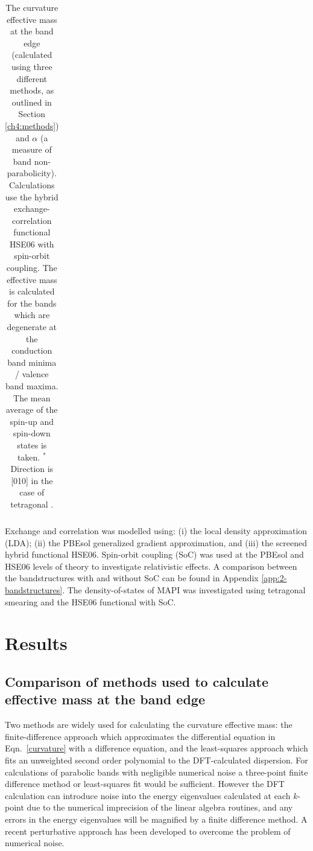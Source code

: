 \begin{landscape}
\begin{table}[tb]
\begin{tabular}{@{}lclllclllclllclll@{}}
\bottomrule
\end{tabular} 
\caption[Values for the effective mass and alpha parameter]{\label{largetable} The curvature effective mass at the band edge (calculated using three different methods, as outlined in Section \ref{ch4:methods}) and $\alpha$ (a measure of band non-parabolicity). Calculations use the hybrid exchange-correlation functional HSE06 with spin-orbit coupling. The effective mass is calculated for the bands which are degenerate at the conduction band minima / valence band maxima. The mean average of the spin-up and spin-down states is taken. $^*$Direction is [010] in the case of tetragonal . }
\end{table}
\end{landscape}

Exchange and correlation was modelled using: (i) the local density approximation (LDA); (ii) the PBEsol\autocite{Perdew2008} generalized gradient approximation, and (iii) the screened hybrid functional HSE06.\autocite{Heyd2003} Spin-orbit coupling (SoC) was used at the PBEsol and HSE06 levels of theory to investigate relativistic effects. A comparison between the bandstructures with and without SoC can be found in Appendix \ref{app:2-bandstructures}.
The density-of-states of MAPI was investigated using tetragonal smearing and the HSE06 functional with SoC. 

\section{Results}

\subsection{Comparison of methods used to calculate effective mass at the band edge}

Two methods are widely used for calculating the curvature effective mass:
the finite-difference approach which approximates the differential equation in Eqn.\ \ref{curvature} with a difference equation,
and the least-squares approach which fits an unweighted second order polynomial to the DFT-calculated dispersion. 
For calculations of parabolic bands with negligible numerical noise a three-point finite difference method or least-squares fit would be sufficient. 
However the DFT calculation can introduce noise into the energy eigenvalues calculated at each $k$-point due to the numerical imprecision of the linear algebra routines,
and any errors in the energy eigenvalues will be magnified by a finite difference method.\autocite{Nearing2010} 
A recent perturbative approach has been developed to overcome the problem of numerical noise.\autocite{Laflamme2016} 

